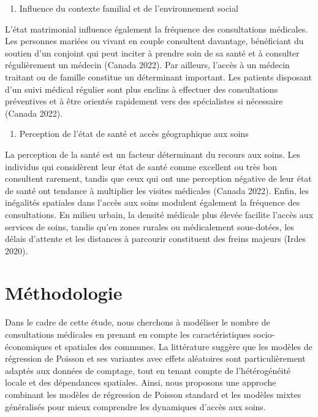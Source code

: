 \documentclass[
]{article}
\providecommand{\tightlist}{%
  \setlength{\itemsep}{0pt}\setlength{\parskip}{0pt}}
\begin{document}
\begin{enumerate}
\def\labelenumi{\arabic{enumi}.}
\setcounter{enumi}{2}
\tightlist
\item
  Influence du contexte familial et de l'environnement social
\end{enumerate}

L'état matrimonial influence également la fréquence des consultations
médicales. Les personnes mariées ou vivant en couple consultent
davantage, bénéficiant du soutien d'un conjoint qui peut inciter à
prendre soin de sa santé et à consulter régulièrement un médecin (Canada
2022). Par ailleurs, l'accès à un médecin traitant ou de famille
constitue un déterminant important. Les patients disposant d'un suivi
médical régulier sont plus enclins à effectuer des consultations
préventives et à être orientés rapidement vers des spécialistes si
nécessaire (Canada 2022).

\begin{enumerate}
\def\labelenumi{\arabic{enumi}.}
\setcounter{enumi}{3}
\tightlist
\item
  Perception de l'état de santé et accès géographique aux soins
\end{enumerate}

La perception de la santé est un facteur déterminant du recours aux
soins. Les individus qui considèrent leur état de santé comme excellent
ou très bon consultent rarement, tandis que ceux qui ont une perception
négative de leur état de santé ont tendance à multiplier les visites
médicales (Canada 2022). Enfin, les inégalités spatiales dans l'accès
aux soins modulent également la fréquence des consultations. En milieu
urbain, la densité médicale plus élevée facilite l'accès aux services de
soins, tandis qu'en zones rurales ou médicalement sous-dotées, les
délais d'attente et les distances à parcourir constituent des freins
majeurs (Irdes 2020).

\hypertarget{muxe9thodologie}{%
\section{Méthodologie}\label{muxe9thodologie}}

Dans le cadre de cette étude, nous cherchons à modéliser le nombre de
consultations médicales en prenant en compte les caractéristiques
socio-économiques et spatiales des communes. La littérature suggère que
les modèles de régression de Poisson et ses variantes avec effets
aléatoires sont particulièrement adaptés aux données de comptage, tout
en tenant compte de l'hétérogénéité locale et des dépendances spatiales.
Ainsi, nous proposons une approche combinant les modèles de régression
de Poisson standard et les modèles mixtes généralisés pour mieux
comprendre les dynamiques d'accès aux soins.
\end{document}
